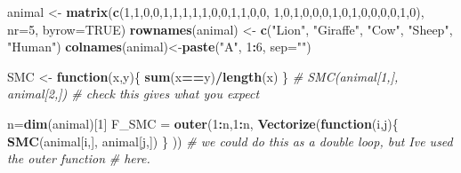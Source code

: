 \documentclass[
]{book}
\newenvironment{Shaded}{\begin{snugshade}}{\end{snugshade}}
\newcommand{\AttributeTok}[1]{\textcolor[rgb]{0.13,0.29,0.53}{#1}}
\newcommand{\CommentTok}[1]{\textcolor[rgb]{0.56,0.35,0.01}{\textit{#1}}}
\newcommand{\ConstantTok}[1]{\textcolor[rgb]{0.56,0.35,0.01}{#1}}
\newcommand{\ControlFlowTok}[1]{\textcolor[rgb]{0.13,0.29,0.53}{\textbf{#1}}}
\newcommand{\DecValTok}[1]{\textcolor[rgb]{0.00,0.00,0.81}{#1}}
\newcommand{\FunctionTok}[1]{\textcolor[rgb]{0.13,0.29,0.53}{\textbf{#1}}}
\newcommand{\NormalTok}[1]{#1}
\newcommand{\OtherTok}[1]{\textcolor[rgb]{0.56,0.35,0.01}{#1}}
\newcommand{\SpecialCharTok}[1]{\textcolor[rgb]{0.81,0.36,0.00}{\textbf{#1}}}
\newcommand{\StringTok}[1]{\textcolor[rgb]{0.31,0.60,0.02}{#1}}
\theoremstyle{definition}
\theoremstyle{definition}
\theoremstyle{definition}
\theoremstyle{definition}
\theoremstyle{remark}
\begin{document}
\begin{Shaded}
\begin{Highlighting}[]
\NormalTok{animal }\OtherTok{\textless{}{-}} \FunctionTok{matrix}\NormalTok{(}\FunctionTok{c}\NormalTok{(}\DecValTok{1}\NormalTok{,}\DecValTok{1}\NormalTok{,}\DecValTok{0}\NormalTok{,}\DecValTok{0}\NormalTok{,}\DecValTok{1}\NormalTok{,}\DecValTok{1}\NormalTok{,}\DecValTok{1}\NormalTok{,}\DecValTok{1}\NormalTok{,}\DecValTok{1}\NormalTok{,}\DecValTok{0}\NormalTok{,}\DecValTok{0}\NormalTok{,}\DecValTok{1}\NormalTok{,}\DecValTok{1}\NormalTok{,}\DecValTok{0}\NormalTok{,}\DecValTok{0}\NormalTok{,}
                   \DecValTok{1}\NormalTok{,}\DecValTok{0}\NormalTok{,}\DecValTok{1}\NormalTok{,}\DecValTok{0}\NormalTok{,}\DecValTok{0}\NormalTok{,}\DecValTok{0}\NormalTok{,}\DecValTok{1}\NormalTok{,}\DecValTok{0}\NormalTok{,}\DecValTok{1}\NormalTok{,}\DecValTok{0}\NormalTok{,}\DecValTok{0}\NormalTok{,}\DecValTok{0}\NormalTok{,}\DecValTok{0}\NormalTok{,}\DecValTok{1}\NormalTok{,}\DecValTok{0}\NormalTok{), }
                 \AttributeTok{nr=}\DecValTok{5}\NormalTok{, }\AttributeTok{byrow=}\ConstantTok{TRUE}\NormalTok{)}
\FunctionTok{rownames}\NormalTok{(animal) }\OtherTok{\textless{}{-}} \FunctionTok{c}\NormalTok{(}\StringTok{"Lion"}\NormalTok{, }\StringTok{"Giraffe"}\NormalTok{, }\StringTok{"Cow"}\NormalTok{, }\StringTok{"Sheep"}\NormalTok{, }\StringTok{"Human"}\NormalTok{)}
\FunctionTok{colnames}\NormalTok{(animal)}\OtherTok{\textless{}{-}}\FunctionTok{paste}\NormalTok{(}\StringTok{"A"}\NormalTok{, }\DecValTok{1}\SpecialCharTok{:}\DecValTok{6}\NormalTok{, }\AttributeTok{sep=}\StringTok{""}\NormalTok{)}

\NormalTok{SMC }\OtherTok{\textless{}{-}} \ControlFlowTok{function}\NormalTok{(x,y)\{}
  \FunctionTok{sum}\NormalTok{(x}\SpecialCharTok{==}\NormalTok{y)}\SpecialCharTok{/}\FunctionTok{length}\NormalTok{(x)}
\NormalTok{\}}
\CommentTok{\# SMC(animal[1,], animal[2,]) \# check this gives what you expect}

\NormalTok{n}\OtherTok{=}\FunctionTok{dim}\NormalTok{(animal)[}\DecValTok{1}\NormalTok{]}
\NormalTok{F\_SMC }\OtherTok{=} \FunctionTok{outer}\NormalTok{(}\DecValTok{1}\SpecialCharTok{:}\NormalTok{n,}\DecValTok{1}\SpecialCharTok{:}\NormalTok{n,}
              \FunctionTok{Vectorize}\NormalTok{(}\ControlFlowTok{function}\NormalTok{(i,j)\{}
                \FunctionTok{SMC}\NormalTok{(animal[i,], animal[j,])}
\NormalTok{                \}}
\NormalTok{                ))}
\CommentTok{\# we could do this as a double loop, but I\textquotesingle{}ve used the outer function}
\CommentTok{\# here.}
\end{Highlighting}
\end{Shaded}
\end{document}
